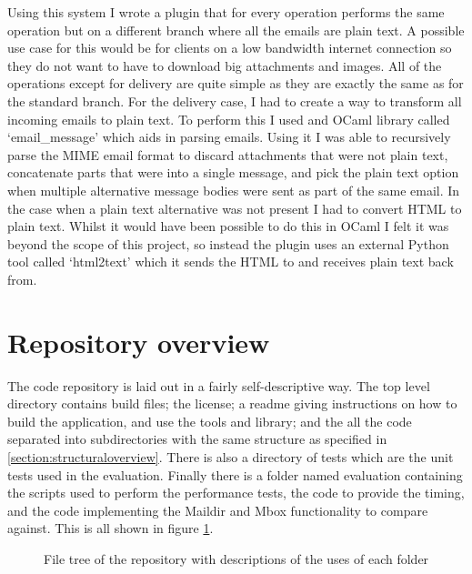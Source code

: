 Using this system I wrote a plugin that for every operation performs the same operation but on a different branch where all the emails are plain text. A possible use case for this would be for clients on a low bandwidth internet connection so they do not want to have to download big attachments and images. All of the operations except for delivery are quite simple as they are exactly the same as for the standard branch. For the delivery case, I had to create a way to transform all incoming emails to plain text. To perform this I used and OCaml library called `email\_message' which aids in parsing emails. Using it I was able to recursively parse the MIME email format to discard attachments that were not plain text, concatenate parts that were into a single message, and pick the plain text option when multiple alternative message bodies were sent as part of the same email. In the case when a plain text alternative was not present I had to convert HTML to plain text. Whilst it would have been possible to do this in OCaml I felt it was beyond the scope of this project, so instead the plugin uses an external Python tool called `html2text' which it sends the HTML to and receives plain text back from.

\section{Repository overview}

The code repository is laid out in a fairly self-descriptive way. The top level directory contains build files; the license; a readme giving instructions on how to build the application, and use the tools and library; and the all the code separated into subdirectories with the same structure as specified in \ref{section:structuraloverview}. There is also a directory of tests which are the unit tests used in the evaluation. Finally there is a folder named evaluation containing the scripts used to perform the performance tests, the code to provide the timing, and the code implementing the Maildir and Mbox functionality to compare against. This is all shown in figure \ref{fig:repositorytree}.

\begin{figure}[h]
\footnotesize
{}
\caption{File tree of the repository with descriptions of the uses of each folder}
\label{fig:repositorytree}
\end{figure}
